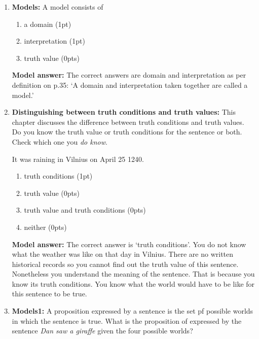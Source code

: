 \documentclass[a4,11pt]{article}
\begin{document}
\begin{enumerate}[leftmargin = 12pt]
          \item {\bf Models:}   A model consists of
       \begin{enumerate}[noitemsep]
       \item a domain (1pt)
        \item interpretation (1pt)
        \item truth value (0pts)
         \end{enumerate}
            
        {\bf Model answer:} The correct answers are domain and interpretation as per definition on p.35: `A domain and interpretation taken together are called a model.'
            
      
      \item { \bf Distinguishing between truth conditions and truth values:} This chapter discusses the difference between truth conditions and truth values. Do you know the truth value or truth conditions for the sentence or both. Check which one you \textit{do know}.

\begin{exe}
\ex It was raining in Vilnius on April 25 1240.
\end{exe}

       \begin{enumerate}[noitemsep]
       \item truth conditions (1pt)
        \item truth value (0pts)
        \item truth value and truth conditions (0pts)
        \item neither (0pts)
         \end{enumerate}

{\bf Model answer:} The correct answer is `truth conditions'. You do not know what the weather was like on that day in Vilnius. There are no written historical records so you cannot find out the truth value of this sentence. Nonetheless you understand the meaning of the sentence. That is because you know its truth conditions. You know what the world would have to be like for this sentence to be true.   
      
      \item {\bf Models1:}  A proposition expressed by a sentence is the set pf possible worlds in which the sentence is true. What is the proposition of expressed by the sentence \textit{Dan saw a giraffe} given the four possible worlds?
      



\begin{multicols}{2}


\end{multicols}
\end{enumerate}
\end{document}
